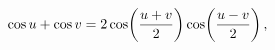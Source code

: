 \[\mathop{\cos\/}\nolimits u+\mathop{\cos\/}\nolimits v=2\mathop{\cos\/}%
\nolimits\!\left(\frac{u+v}{2}\right)\mathop{\cos\/}\nolimits\!\left(\frac{u-v%
}{2}\right),\]